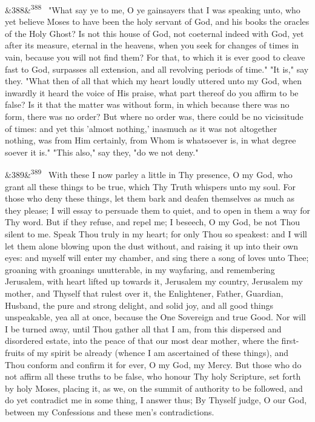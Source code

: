 \documentclass[12pt]{article}
\newcommand{\para}[1][]{\par\noindent\ifx&#1&\else\textsuperscript{\footnotesize #1}~\fi}
\begin{document}
\para[388] "What say ye to me, O ye gainsayers that I was speaking unto, who yet believe Moses to have been the holy servant of God, and his books the oracles of the Holy Ghost? Is not this house of God, not coeternal indeed with God, yet after its measure, eternal in the heavens, when you seek for changes of times in vain, because you will not find them? For that, to which it is ever good to cleave fast to God, surpasses all extension, and all revolving periods of time." "It is," say they. "What then of all that which my heart loudly uttered unto my God, when inwardly it heard the voice of His praise, what part thereof do you affirm to be false? Is it that the matter was without form, in which because there was no form, there was no order? But where no order was, there could be no vicissitude of times: and yet this 'almost nothing,' inasmuch as it was not altogether nothing, was from Him certainly, from Whom is whatsoever is, in what degree soever it is." "This also," say they, "do we not deny."

\para[389] With these I now parley a little in Thy presence, O my God, who grant all these things to be true, which Thy Truth whispers unto my soul. For those who deny these things, let them bark and deafen themselves as much as they please; I will essay to persuade them to quiet, and to open in them a way for Thy word. But if they refuse, and repel me; I beseech, O my God, be not Thou silent to me. Speak Thou truly in my heart; for only Thou so speakest: and I will let them alone blowing upon the dust without, and raising it up into their own eyes: and myself will enter my chamber, and sing there a song of loves unto Thee; groaning with groanings unutterable, in my wayfaring, and remembering Jerusalem, with heart lifted up towards it, Jerusalem my country, Jerusalem my mother, and Thyself that rulest over it, the Enlightener, Father, Guardian, Husband, the pure and strong delight, and solid joy, and all good things unspeakable, yea all at once, because the One Sovereign and true Good. Nor will I be turned away, until Thou gather all that I am, from this dispersed and disordered estate, into the peace of that our most dear mother, where the first-fruits of my spirit be already (whence I am ascertained of these things), and Thou conform and confirm it for ever, O my God, my Mercy. But those who do not affirm all these truths to be false, who honour Thy holy Scripture, set forth by holy Moses, placing it, as we, on the summit of authority to be followed, and do yet contradict me in some thing, I answer thus; By Thyself judge, O our God, between my Confessions and these men's contradictions.
\end{document}
